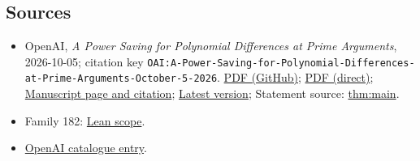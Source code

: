 \documentclass[11pt]{article}
\begin{document}
\subsection{Sources}
\begin{itemize}
\item OpenAI, \emph{A Power Saving for Polynomial Differences at Prime Arguments}, 2026-10-05; citation key \texttt{OAI:A-Power-Saving-for-Polynomial-Differences-at-Prime-Arguments-October-5-2026}. \href{https://github.com/openai/math/blob/adc7f1241b42e322a6451854ab7e4b4c146bf78a/preprints/A-Power-Saving-for-Polynomial-Differences-at-Prime-Arguments-October-5-2026/prime-argument-polynomial-differences.pdf}{PDF (GitHub)}; \href{https://github.com/openai/math/raw/adc7f1241b42e322a6451854ab7e4b4c146bf78a/preprints/A-Power-Saving-for-Polynomial-Differences-at-Prime-Arguments-October-5-2026/prime-argument-polynomial-differences.pdf}{PDF (direct)}; \href{https://github.com/openai/math/blob/adc7f1241b42e322a6451854ab7e4b4c146bf78a/preprints/A-Power-Saving-for-Polynomial-Differences-at-Prime-Arguments-October-5-2026/README.md}{Manuscript page and citation}; \href{https://github.com/openai/math/blob/main/preprints/A-Power-Saving-for-Polynomial-Differences-at-Prime-Arguments-October-5-2026/prime-argument-polynomial-differences.pdf}{Latest version}; Statement source: \href{https://github.com/openai/math/blob/adc7f1241b42e322a6451854ab7e4b4c146bf78a/preprints/A-Power-Saving-for-Polynomial-Differences-at-Prime-Arguments-October-5-2026/build/sections/introduction.tex\#L19}{thm:main}.
\item Family 182: \href{https://github.com/openai/math/blob/adc7f1241b42e322a6451854ab7e4b4c146bf78a/lean/docs/182.md}{Lean scope}.
\item \href{https://github.com/openai/math/blob/adc7f1241b42e322a6451854ab7e4b4c146bf78a/CONTENTS.md}{OpenAI catalogue entry}.
\end{itemize}
\end{document}
